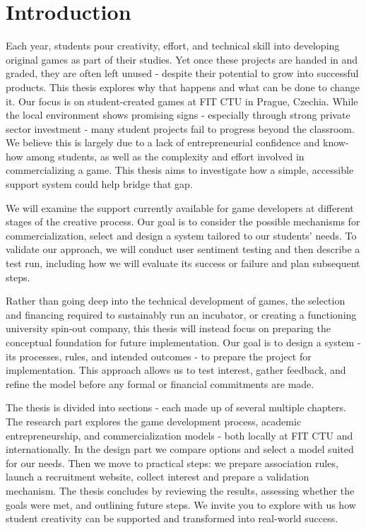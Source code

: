\chapter*{Introduction}
Each year, students pour creativity, effort, and technical skill into developing original games as part of their studies. Yet once these projects are handed in and graded, they are often left unused - despite their potential to grow into successful products. This thesis explores why that happens and what can be done to change it.
Our focus is on student-created games at FIT CTU in Prague, Czechia. While the local environment shows promising signs - especially through strong private sector investment - many student projects fail to progress beyond the classroom. We believe this is largely due to a lack of entrepreneurial confidence and know-how among students, as well as the complexity and effort involved in commercializing a game. This thesis aims to investigate how a simple, accessible support system could help bridge that gap.

We will examine the support currently available for game developers at different stages of the creative process. Our goal is to consider the possible mechanisms for commercialization, select and design a system tailored to our students’ needs. To validate our approach, we will conduct user sentiment testing and then describe a test run, including how we will evaluate its success or failure and plan subsequent steps.

Rather than going deep into the technical development of games, the selection and financing required to sustainably run an incubator, or creating a functioning university spin-out company, this thesis will instead focus on preparing the conceptual foundation for future implementation. Our goal is to design a system - its processes, rules, and intended outcomes - to prepare the project for implementation. This approach allows us to test interest, gather feedback, and refine the model before any formal or financial commitments are made.

The thesis is divided into sections - each made up of several multiple chapters. The research part explores the game development process, academic entrepreneurship, and commercialization models - both locally at FIT CTU and internationally. In the design part we compare options and select a model suited for our needs. Then we move to practical steps: we prepare association rules, launch a recruitment website, collect interest and prepare a validation mechanism. The thesis concludes by reviewing the results, assessing whether the goals were met, and outlining future steps. We invite you to explore with us how student creativity can be supported and transformed into real-world success.